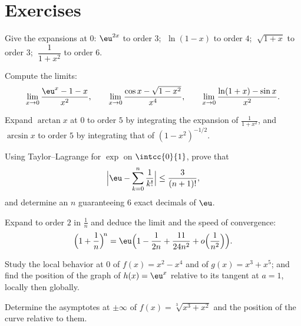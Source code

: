 \section{Exercises}

\begin{exercise}[$\star$]\label{exo:b1:taylor:1}
Give the expansions at $0$: $\eu^{2x}$ to order $3$;
$\;\ln(1 - x)$ to order $4$; $\;\sqrt{1 + x}$ to order $3$;
$\;\dfrac{1}{1 + x^2}$ to order $6$.
\end{exercise}

\begin{exercise}[$\star$]\label{exo:b1:taylor:2}
Compute the limits:
\[
\lim_{x\to 0} \frac{\eu^x - 1 - x}{x^2},
\qquad
\lim_{x\to 0} \frac{\cos x - \sqrt{1 - x^2}}{x^4},
\qquad
\lim_{x\to 0} \frac{\ln(1+x) - \sin x}{x^2}.
\]
\end{exercise}

\begin{exercise}[$\star$]\label{exo:b1:taylor:3}
Expand $\arctan x$ at $0$ to order $5$ by integrating the expansion
of $\frac{1}{1 + x^2}$, and $\arcsin x$ to order $5$ by integrating
that of $(1 - x^2)^{-1/2}$.
\end{exercise}

\begin{exercise}[$\star$]\label{exo:b1:taylor:4}
Using Taylor--Lagrange for $\exp$ on $\intcc{0}{1}$, prove that
\[
\Bigl| \eu - \sum_{k=0}^{n} \frac{1}{k!} \Bigr| \leq
\frac{3}{(n+1)!},
\]
and determine an $n$ guaranteeing $6$ exact decimals of $\eu$.
\end{exercise}

\begin{exercise}[$\star\star$]\label{exo:b1:taylor:5}
Expand to order $2$ in $\frac1n$ and deduce the limit and the
speed of convergence:
\[
\Bigl(1 + \frac 1n\Bigr)^{\!n}
= \eu\Bigl(1 - \frac{1}{2n} + \frac{11}{24n^2} +
o\Bigl(\frac{1}{n^2}\Bigr)\Bigr).
\]
\end{exercise}

\begin{exercise}[$\star\star$]\label{exo:b1:taylor:6}
Study the local behavior at $0$ of $f(x) = x^2 - x^4$ and of $g(x) =
x^3 + x^5$; and find the position of the graph of $h(x) = \eu^x$
relative to its tangent at $a = 1$, locally then globally.
\end{exercise}

\begin{exercise}[$\star\star$]\label{exo:b1:taylor:7}
Determine the asymptotes at $\pm\infty$ of $f(x) =
\sqrt[3]{x^3 + x^2}$ and the position of the curve relative to
them.
\end{exercise}

